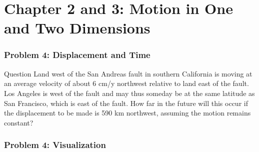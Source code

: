 \documentclass{beamer}
\begin{document}
\section{Chapter 2 and 3: Motion in One and Two Dimensions}

\begin{frame}
\frametitle{Problem 4: Displacement and Time}
\begin{block}{Question}
Land west of the San Andreas fault in southern California is moving at an average velocity of about 6 cm/y northwest relative to land east of the fault. Los Angeles is west of the fault and may thus someday be at the same latitude as San Francisco, which is east of the fault. How far in the future will this occur if the displacement to be made is 590 km northwest, assuming the motion remains constant?
\end{block}
\end{frame}

\begin{frame}
\frametitle{Problem 4: Visualization}

\end{frame}
\end{document}

